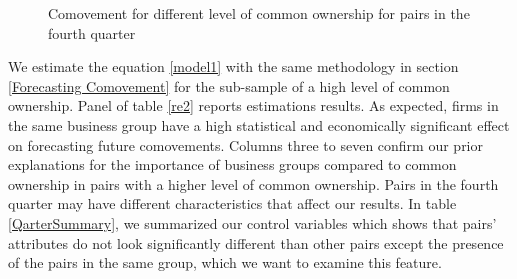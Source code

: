 			
						\begin{figure}[htbp]
							\centerfloat
							\caption{Comovement for different level of common ownership for pairs in the fourth quarter}
								\label{Qmcorr5subsample}
						\end{figure}
			
			
	
	We estimate the equation \ref{model1} with the same methodology in section \ref{Forecasting Comovement}  for the sub-sample of a high level of common ownership. Panel  of table \ref{re2}  reports estimations results. As expected, firms in the same business group have a high statistical and economically significant effect on forecasting future comovements. Columns three to seven confirm our prior explanations for the importance of business groups compared to common ownership in pairs with a higher level of common ownership. Pairs in the fourth quarter may have different characteristics that affect our results. In table \ref{QarterSummary}, we summarized our control variables which shows that pairs' attributes do not look significantly different than other pairs except the presence of the pairs in the same group, which we want to examine this feature.
	
